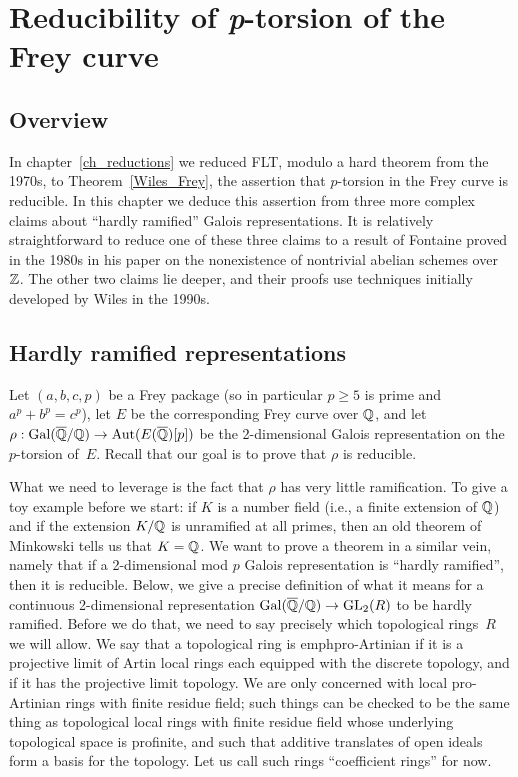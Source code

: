 \chapter{Reducibility of {\it p}-torsion of the Frey curve}\label{ch_freyreduction}

\section{Overview}

In chapter~\ref{ch_reductions} we reduced FLT, modulo a hard theorem from the 1970s,
to Theorem~\ref{Wiles_Frey}, the assertion that $p$-torsion in the Frey
curve is reducible. In this chapter we deduce this assertion from three more complex claims
about ``hardly ramified'' Galois representations. It is relatively straightforward
to reduce one of these three claims to a result of Fontaine proved in the 1980s in his
paper on the nonexistence of nontrivial abelian schemes over $\mathbb{Z}$. The other two
claims lie deeper, and their proofs use techniques initially developed by Wiles in
the 1990s.

\section{Hardly ramified representations}

Let $(a,b,c,p)$ be a Frey package (so in particular $p\geq5$ is prime and $a^p+b^p=c^p$),
let $E$ be the corresponding Frey curve over $\mathbb{Q}$, and let $\rho:\operatorname{Gal}(\overline{\mathbb{Q}}/\mathbb{Q})\to\operatorname{Aut}(E(\overline{\mathbb{Q}})[p])$
be the 2-dimensional Galois representation on the $p$-torsion of~$E$. Recall that our goal
is to prove that $\rho$ is reducible.

What we need to leverage is the fact that $\rho$ has very little ramification. To give
a toy example before we start: if $K$ is a number field (i.e., a finite extension of $\mathbb{Q}$)
and if the extension $K/\mathbb{Q}$ is unramified at all primes, then an old theorem of
Minkowski tells us that $K=\mathbb{Q}$. We want to prove a theorem in a similar vein, namely
that if a 2-dimensional mod $p$ Galois representation is ``hardly ramified'', then it is reducible.
Below, we give a precise
definition of what it means for a continuous 2-dimensional representation $\operatorname{Gal}(\overline{\mathbb{Q}}/\mathbb{Q})\to\operatorname{GL}_2(R)$
to be hardly ramified. Before we do that, we need to say precisely which topological rings~$R$
we will allow. We say that a topological ring is emph{pro-Artinian} if it is a projective
limit of Artin local rings each equipped with the discrete topology, and if it has the
projective limit topology. We are only concerned with local pro-Artinian rings with finite
residue field; such things can be checked to be the same thing as topological
local rings with finite residue field whose underlying topological space is profinite,
and such that additive translates of open ideals form a basis for the topology.
Let us call such rings ``coefficient rings'' for now.

